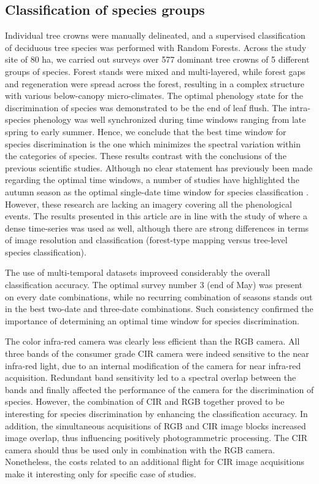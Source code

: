 \documentclass[remotesensing,article,submit,moreauthors,pdftex,12pt,a4paper]{mdpi} %
\begin{document}
\subsection{Classification of species groups}

Individual tree crowns were manually delineated, and a supervised classification of deciduous tree species was performed with Random Forests. 
Across the study site of 80 ha, we carried out surveys over 577 dominant tree crowns of 5 different groups of species. 
Forest stands were mixed and multi-layered, while forest gaps and regeneration were spread across the forest, resulting in a complex structure with various below-canopy micro-climates. 
The optimal phenology state for the discrimination of species was demonstrated to be the end of leaf flush. 
The intra-species phenology was well synchronized during time windows ranging from late spring to early summer. 
Hence, we conclude that the best time window for species discrimination is the one which minimizes the spectral variation within the categories of species. 
These results contrast with the conclusions of the previous scientific studies. 
Although no clear statement has previously been made regarding the optimal time windows, a number of studies have highlighted the autumn season as the optimal single-date time window for species classification \citep{key_comparison_2001,hill_mapping_2010, somers_multi-temporal_2013}. 
However, these research are lacking an imagery covering all the phenological events.
The results presented in this article are in line with the study of \citeauthor{kempeneers_data_2011} \cite{kempeneers_data_2011} where a dense time-series was used as well, although there are strong differences in terms of image resolution and classification (forest-type mapping versus tree-level species classification).

The use of multi-temporal datasets improveed considerably the overall classification accuracy. 
The optimal survey number 3 (end of May) was present on every date combinations, while no recurring combination of seasons stands out in the best two-date and three-date combinations.
Such consistency confirmed the importance of determining an optimal time window for species discrimination.

The color infra-red camera was clearly less efficient than the RGB camera. All three bands of the consumer grade CIR camera were indeed sensitive to the near infra-red light, due to an internal modification of the camera for near infra-red acquisition. Redundant band sensitivity led to a spectral overlap between the bands and finally affected the performance of the camera for the discrimination of species. However, the combination of CIR and RGB together proved to be interesting for species discrimination by enhancing the classification accuracy.
In addition, the simultaneous acquisitions of RGB and CIR image blocks increased image overlap, thus influencing positively photogrammetric processing.
The CIR camera should thus be used only in combination with the RGB camera.
Nonetheless, the costs related to an additional flight for CIR image acquisitions make it interesting only for specific case of studies.
\end{document}
